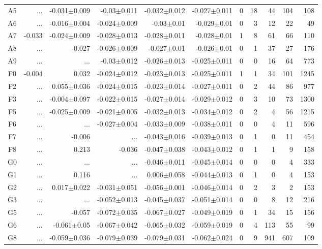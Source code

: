 \begin{table}[t]
\begin{center}
\begin{tabular}{c|rrrrr|rrrrr}
A5	&	 ...	&	-0.031$\pm$0.009	&	-0.03$\pm$0.011	&	-0.032$\pm$0.012	&	-0.027$\pm$0.011	&	0	&	18	&	44	&	104	&	108	\\
A6	&	 ...	&	-0.016$\pm$0.004	&	-0.024$\pm$0.009	&	-0.03$\pm$0.01	&	-0.029$\pm$0.01	&	0	&	3	&	12	&	22	&	49	\\
A7	&	-0.033	&	-0.024$\pm$0.009	&	-0.028$\pm$0.013	&	-0.028$\pm$0.011	&	-0.028$\pm$0.01	&	1	&	8	&	61	&	66	&	110	\\
A8	&	 ...	&	-0.027	&	-0.026$\pm$0.009	&	-0.027$\pm$0.01	&	-0.026$\pm$0.01	&	0	&	1	&	37	&	27	&	176	\\
A9	&	 ...	&	 ...	&	-0.03$\pm$0.012	&	-0.026$\pm$0.013	&	-0.025$\pm$0.011	&	0	&	0	&	16	&	64	&	773	\\
F0	&	-0.004	&	0.032	&	-0.024$\pm$0.012	&	-0.023$\pm$0.013	&	-0.025$\pm$0.011	&	1	&	1	&	34	&	101	&	1245	\\
F2	&	 ...	&	0.055$\pm$0.036	&	-0.024$\pm$0.015	&	-0.023$\pm$0.014	&	-0.027$\pm$0.011	&	0	&	2	&	44	&	86	&	977	\\
F3	&	 ...	&	-0.004$\pm$0.097	&	-0.022$\pm$0.015	&	-0.027$\pm$0.014	&	-0.029$\pm$0.012	&	0	&	3	&	10	&	73	&	1300	\\
F5	&	 ...	&	-0.025$\pm$0.009	&	-0.021$\pm$0.005	&	-0.032$\pm$0.013	&	-0.034$\pm$0.012	&	0	&	2	&	4	&	56	&	1215	\\
F6	&	 ...	&	 ...	&	-0.027$\pm$0.004	&	-0.033$\pm$0.009	&	-0.038$\pm$0.011	&	0	&	0	&	4	&	11	&	596	\\
F7	&	 ...	&	-0.006	&	 ...	&	-0.043$\pm$0.016	&	-0.039$\pm$0.013	&	0	&	1	&	0	&	11	&	454	\\
F8	&	 ...	&	0.213	&	-0.036	&	-0.047$\pm$0.038	&	-0.043$\pm$0.012	&	0	&	1	&	1	&	9	&	158	\\
G0	&	 ...	&	 ...	&	 ...	&	-0.046$\pm$0.011	&	-0.045$\pm$0.014	&	0	&	0	&	0	&	4	&	333	\\
G1	&	 ...	&	0.116	&	 ...	&	0.006$\pm$0.058	&	-0.044$\pm$0.013	&	0	&	1	&	0	&	4	&	153	\\
G2	&	 ...	&	0.017$\pm$0.022	&	-0.031$\pm$0.051	&	-0.056$\pm$0.001	&	-0.046$\pm$0.014	&	0	&	2	&	3	&	2	&	153	\\
G3	&	 ...	&	 ...	&	-0.052$\pm$0.013	&	-0.045$\pm$0.037	&	-0.051$\pm$0.014	&	0	&	0	&	8	&	12	&	216	\\
G5	&	 ...	&	-0.057	&	-0.072$\pm$0.035	&	-0.067$\pm$0.027	&	-0.049$\pm$0.019	&	0	&	1	&	34	&	15	&	156	\\
G6	&	 ...	&	-0.061$\pm$0.05	&	-0.067$\pm$0.042	&	-0.065$\pm$0.032	&	-0.059$\pm$0.019	&	0	&	4	&	113	&	55	&	99	\\
G8	&	 ...	&	-0.059$\pm$0.036	&	-0.079$\pm$0.039	&	-0.079$\pm$0.031	&	-0.062$\pm$0.024	&	0	&	9	&	941	&	607	&	109	\\

\end{tabular}
\end{center}
\end{table}

